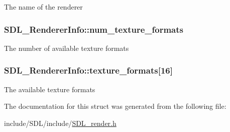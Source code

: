 The name of the renderer \hypertarget{struct_s_d_l___renderer_info_acdec165b2053b914313f5996983ec6b8}{
\subsubsection[{num\-\_\-texture\-\_\-formats}]{ S\-D\-L\-\_\-\-Renderer\-Info\-::num\-\_\-texture\-\_\-formats}}\label{struct_s_d_l___renderer_info_acdec165b2053b914313f5996983ec6b8}
The number of available texture formats \hypertarget{struct_s_d_l___renderer_info_a88450f9d48e593ec4571e3ba7cc3427d}{
\subsubsection[{texture\-\_\-formats}]{ S\-D\-L\-\_\-\-Renderer\-Info\-::texture\-\_\-formats\mbox{[}16\mbox{]}}}\label{struct_s_d_l___renderer_info_a88450f9d48e593ec4571e3ba7cc3427d}
The available texture formats 

The documentation for this struct was generated from the following file\-:\begin{DoxyCompactItemize}
\item 
include/\-S\-D\-L/include/\hyperlink{_s_d_l__render_8h}{S\-D\-L\-\_\-render.\-h}\end{DoxyCompactItemize}
